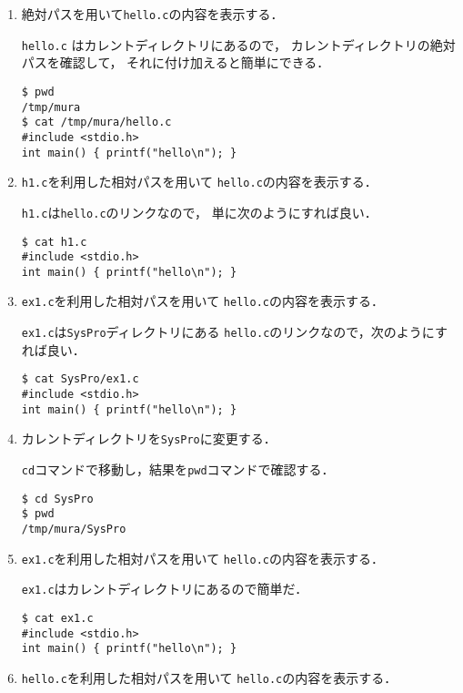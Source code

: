 \documentclass[a4j,twcolumn,11pt,nomag]{ltjarticle}      %
\begin{document}
\begin{enumerate}
\begin{enumerate}
\item 絶対パスを用いて\texttt{hello.c}の内容を表示する．

\texttt{hello.c} はカレントディレクトリにあるので，
カレントディレクトリの絶対パスを確認して，
それに付け加えると簡単にできる．

\begin{lstlisting}[numbers=none]
$ pwd
/tmp/mura
$ cat /tmp/mura/hello.c
#include <stdio.h>
int main() { printf("hello\n"); }
\end{lstlisting}

\item \texttt{h1.c}を利用した相対パスを用いて
\texttt{hello.c}の内容を表示する．

\texttt{h1.c}は\texttt{hello.c}のリンクなので，
単に次のようにすれば良い．

\begin{lstlisting}[numbers=none]
$ cat h1.c
#include <stdio.h>
int main() { printf("hello\n"); }
\end{lstlisting}

\item \texttt{ex1.c}を利用した相対パスを用いて
\texttt{hello.c}の内容を表示する．

\texttt{ex1.c}は\texttt{SysPro}ディレクトリにある
\texttt{hello.c}のリンクなので，次のようにすれば良い．

\begin{lstlisting}[numbers=none]
$ cat SysPro/ex1.c
#include <stdio.h>
int main() { printf("hello\n"); }
\end{lstlisting}

\item カレントディレクトリを\texttt{SysPro}に変更する．

\texttt{cd}コマンドで移動し，結果を\texttt{pwd}コマンドで確認する．

\begin{lstlisting}[numbers=none]
$ cd SysPro
$ pwd
/tmp/mura/SysPro
\end{lstlisting}

\item \texttt{ex1.c}を利用した相対パスを用いて
\texttt{hello.c}の内容を表示する．

\texttt{ex1.c}はカレントディレクトリにあるので簡単だ．

\begin{lstlisting}[numbers=none]
$ cat ex1.c
#include <stdio.h>
int main() { printf("hello\n"); }
\end{lstlisting}

\item \texttt{hello.c}を利用した相対パスを用いて
\texttt{hello.c}の内容を表示する．


\end{enumerate}
\end{enumerate}
\end{document}
